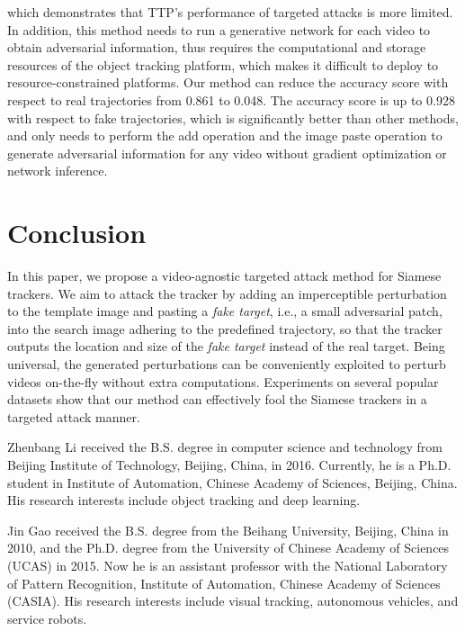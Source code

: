 \documentclass[journal]{IEEEtran}
\newcommand{\ie}{i.e.}
\begin{document}
which demonstrates that TTP's performance of targeted attacks is more limited. In addition, this method needs to run a generative network for each video to obtain adversarial information, thus requires the computational and storage resources of the object tracking platform, which makes it difficult to deploy to resource-constrained platforms. Our method can reduce the accuracy score with respect to real trajectories from 0.861 to 0.048. The accuracy score is up to 0.928 with respect to fake trajectories, which is significantly better than other methods, and only needs to perform the add operation and the image paste operation to generate adversarial information for any video without gradient optimization or network inference.

\section{Conclusion}

In this paper, we propose a video-agnostic targeted attack method for Siamese trackers. 
We aim to attack the tracker by adding an imperceptible perturbation to the template image and pasting a \textit{fake target}, \ie, a small adversarial patch, into the search image adhering to the predefined trajectory, so that the tracker outputs the location and size of the \textit{fake target} instead of the real target. Being universal, the generated perturbations can be conveniently exploited to perturb videos on-the-fly without extra computations.
Experiments on several popular datasets show that our method can effectively fool the Siamese trackers in a targeted attack manner.





\begin{IEEEbiographynophoto}
{Zhenbang Li}
received the B.S. degree in computer science and technology from Beijing Institute of Technology, Beijing, China, in 2016. Currently, he is a Ph.D. student in Institute of Automation, Chinese Academy of Sciences, Beijing, China. His research interests include object tracking and deep learning.
\end{IEEEbiographynophoto}

\begin{IEEEbiographynophoto}
{Jin Gao}
received the B.S. degree from the Beihang University, Beijing, China in 2010, and the Ph.D. degree from the University of Chinese Academy of Sciences (UCAS) in 2015. Now he is an assistant professor with the National Laboratory of Pattern Recognition, Institute of Automation, Chinese Academy of Sciences (CASIA). His research interests include visual tracking, autonomous vehicles, and service robots. 
\end{IEEEbiographynophoto}
\end{document}

